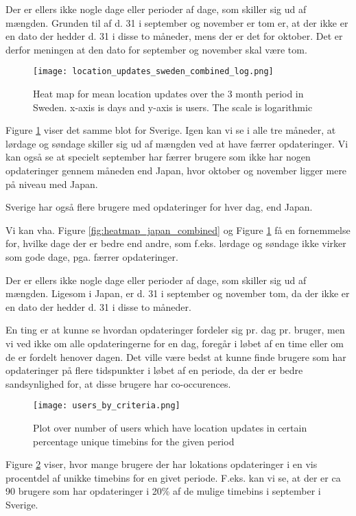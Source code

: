 Der er ellers ikke nogle dage eller perioder af dage, som skiller sig ud af mængden. Grunden til af d. 31 i september og november er tom er, at der ikke er en dato der hedder d. 31 i disse to måneder, mens der er det for oktober. Det er derfor meningen at den dato for september og november skal være tom. 

\begin{figure}[H]
    \hspace*{-1.5cm}
    \centering
    \texttt{[image: location\_updates\_sweden\_combined\_log.png]}
    \caption{Heat map for mean location updates over the 3 month period in Sweden. x-axis is days and y-axis is users. The scale is logarithmic}
    \label{fig:heatmap_sweden_combined}
\end{figure}
Figure \ref{fig:heatmap_sweden_combined} viser det samme blot for Sverige. Igen kan vi se i alle tre måneder, at lørdage og søndage skiller sig ud af mængden ved at have færrer opdateringer.  Vi kan også se at specielt september har færrer brugere som ikke har nogen opdateringer gennem måneden end Japan, hvor oktober og november ligger mere på niveau med Japan. 

Sverige har også flere brugere med opdateringer for hver dag, end Japan. 

Vi kan vha. Figure \ref{fig:heatmap_japan_combined} og Figure \ref{fig:heatmap_sweden_combined} få en fornemmelse for, hvilke dage der er bedre end andre, som f.eks. lørdage og søndage ikke virker som gode dage, pga. færrer opdateringer. 

Der er ellers ikke nogle dage eller perioder af dage, som skiller sig ud af mængden. Ligesom i Japan, er d. 31 i september og november tom, da der ikke er en dato der hedder d. 31 i disse to måneder. 

En ting er at kunne se hvordan opdateringer fordeler sig pr. dag pr. bruger, men vi ved ikke om alle opdateringerne for en dag, foregår i løbet af en time eller om de er fordelt henover dagen. Det ville være bedst at kunne finde brugere som har opdateringer på flere tidspunkter i løbet af en periode, da der er bedre sandsynlighed for, at disse brugere har co-occurences. 


\begin{figure}[H]
    \hspace*{-2.0cm}
    \centering
    \texttt{[image: users\_by\_criteria.png]}
    \caption{Plot over number of users which have location updates in certain percentage unique timebins for the given period}
    \label{fig:users_by_criteria}
\end{figure}
Figure \ref{fig:users_by_criteria} viser, hvor mange brugere der har lokations opdateringer i en vis procentdel af unikke timebins for en givet periode. F.eks. kan vi se, at der er ca 90 brugere som har opdateringer i 20\% af de mulige timebins i september i Sverige. 

